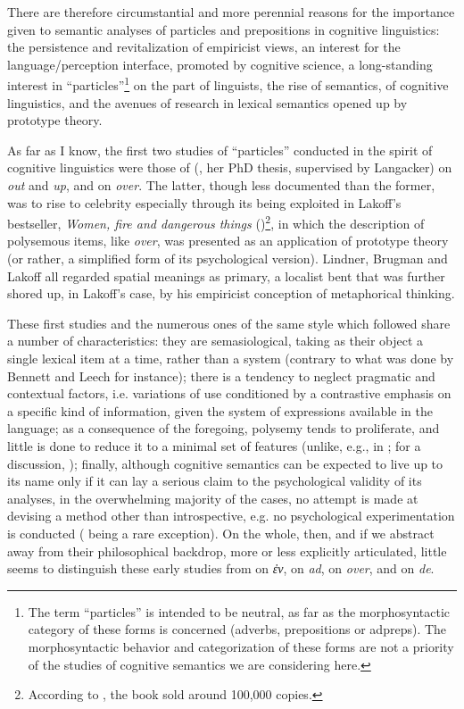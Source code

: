 \documentclass[output=paper]{langscibook}
\begin{document}
There are therefore circumstantial and more perennial reasons for the importance given to semantic analyses of particles and prepositions in cognitive linguistics: the persistence and revitalization of empiricist views, an interest for the language\slash perception interface, promoted by cognitive science, a long-standing interest in “particles”\footnote{\textrm{ The term “particles” is intended to be neutral, as far as the morphosyntactic category of these forms is concerned (adverbs, prepositions or adpreps). The morphosyntactic behavior and categorization of these forms are not a priority of the studies of cognitive semantics we are considering here. }} on the part of linguists, the rise of semantics, of cognitive linguistics, and the avenues of research in lexical semantics opened up by prototype theory.

As far as I know, the first two studies of “particles” conducted in the spirit of cognitive linguistics were those of \citeauthor{lindner_lexico-semantic_1981} (\citeyear{lindner_lexico-semantic_1981}, her PhD thesis, supervised by Langacker) on \textit{out} and \textit{up}, and \citet{brugman_story_1981} on \textit{over}. The latter, though less documented than the former, was to rise to celebrity especially through its being exploited in Lakoff’s bestseller, \textit{Women, fire and dangerous things} (\citeyear{Lakoff1978})\footnote{According to \citet{dirven_does_2001}, the book sold around 100,000 copies.}, in which the description of polysemous items, like \textit{over}, was presented as an application of prototype theory (or rather, a simplified form of its psychological version). Lindner, Brugman and Lakoff all regarded spatial meanings as primary, a localist bent that was further shored up, in Lakoff’s case, by his empiricist conception of metaphorical thinking.

These first studies and the numerous ones of the same style which followed share a number of characteristics: they are semasiological, taking as their object a single lexical item at a time, rather than a system (contrary to what was done by Bennett and Leech for instance); there is a tendency to neglect pragmatic and contextual factors, i.e. variations of use conditioned by a contrastive emphasis on a specific kind of information, given the system of expressions available in the language; as a consequence of the foregoing, polysemy tends to proliferate, and little is done to reduce it to a minimal set of features (unlike, e.g., in \citealt{pottier_systematique_1962}; for a discussion, \citealt{fortis_probleme_2009}); finally, although cognitive semantics can be expected to live up to its name only if it can lay a serious claim to the psychological validity of its analyses, in the overwhelming majority of the cases, no attempt is made at devising a method other than introspective, e.g. no psychological experimentation is conducted (\citealt{sandra_network_1995} being a rare exception). On the whole, then, and if we abstract away from their philosophical backdrop, more or less explicitly articulated, little seems to distinguish these early studies from \citet{aristotle_physics_1957} on \textit{ἐν}, \citet{leibniz_analysis_1986} on \textit{ad}, \citet{harris_hermes_1773} on \textit{over}, and \citet{condillac_cours_1775} on \textit{de}.
\end{document}
